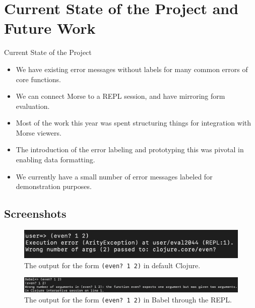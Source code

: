 \documentclass{beamer}
\begin{document}
\section{Current State of the Project and Future Work}
\begin{frame}{Current State of the Project}
  \begin{itemize}
    \item<1-> We have existing error messages without labels for many common errors of core functions.
    \item<2-> We can connect Morse to a REPL session, and have mirroring form evaluation.
    \item<3-> Most of the work this year was spent structuring things for integration with Morse viewers.
    \item<4-> The introduction of the error labeling and prototyping this was pivotal in enabling data formatting.
    \item<5-> We currently have a small number of error messages labeled for demonstration purposes.
  \end{itemize}
\end{frame}

\subsection{Screenshots}
\begin{frame}
  \begin{figure}
    \centering
    \includegraphics[width=\textwidth]{../resources/CljDefaultEven.png}
    \caption{The output for the form \texttt{(even? 1 2)} in default Clojure.}
    \label{fig:defaultclj}
  \end{figure}
\end{frame}

\begin{frame}
  \begin{figure}
    \centering
    \includegraphics[width=\textwidth, height=0.25\textheight]{../resources/BabelREPL.png}
    \caption{The output for the form \texttt{(even? 1 2)} in Babel through the REPL.}
    \label{fig:BabelREPL}
  \end{figure}
\end{frame}
\end{document}
